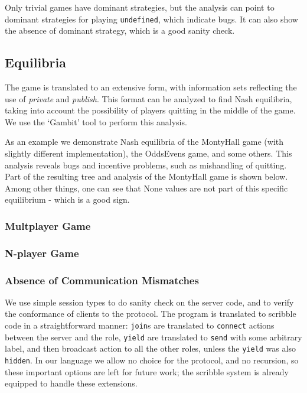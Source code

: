 \documentclass[acmsmall,review,anonymous]{acmart}\settopmatter{printfolios=true,printccs=false,printacmref=false}
\begin{document}
Only trivial games have dominant strategies, but the analysis can point to dominant strategies for playing \texttt{undefined}, which indicate bugs. It can also show the absence of dominant strategy, which is a good sanity check.

\subsection{Equilibria}
The game is translated to an extensive form, with information sets reflecting the use of \emph{private} and \emph{publish}. 
This format can be analyzed to find Nash equilibria, taking into account the possibility of players quitting in the middle of the game. We use the `Gambit' tool to perform this analysis.

As an example we demonstrate Nash equilibria of the MontyHall game (with slightly different implementation), the OddsEvens game, and some others. This analysis reveals bugs and incentive problems, such as mishandling of quitting. Part of the resulting tree and analysis of the MontyHall game is shown below. Among other things, one can see that None values are not part of this specific equilibrium - which is a good sign.


\subsubsection{Multplayer Game}

\subsubsection{N-player Game}

\subsubsection{Absence of Communication Mismatches}
We use simple session types to do sanity check on the server code, and to verify the conformance of clients to the protocol. The program is translated to scribble code in a straightforward manner: \texttt{join}s are translated to \texttt{connect} actions between the server and the role, \texttt{yield} are translated to \texttt{send} with some arbitrary label, and then broadcast action to all the other roles, unless the \texttt{yield} was also \texttt{hidden}. In our language we allow no choice for the protocol, and no recursion, so these important options are left for future work; the scribble system is already equipped to handle these extensions.
\end{document}
